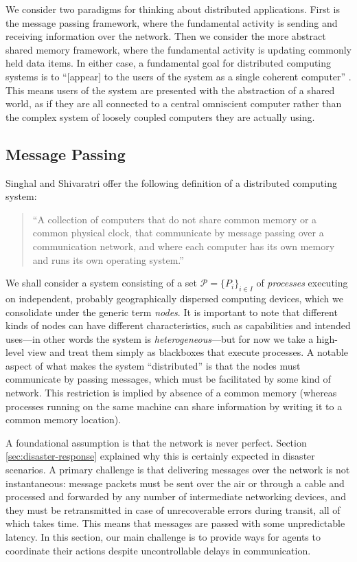 \documentclass[]             %
{NASA}                       %
\theoremstyle{definition}
\begin{document}
We consider two paradigms for thinking about distributed
applications. First is the message passing framework, where the
fundamental activity is sending and receiving information over the
network. Then we consider the more abstract shared memory framework,
where the fundamental activity is updating commonly held data
items. In either case, a fundamental goal for distributed computing
systems is to ``{[}appear{]} to the users of the system as a single
coherent computer'' \cite{TanenbaumSteen07}. This means users of the
system are presented with the abstraction of a shared world, as if
they are all connected to a central omniscient computer rather than
the complex system of loosely coupled computers they are actually
using.

\subsection{Message Passing}
\label{ssec:message-passing}

Singhal and Shivaratri \cite{10.5555/562065} offer the following
definition of a distributed computing system:

\begin{quote}
  ``A collection of computers that do not share common memory or a common
  physical clock, that communicate by message passing over a communication
  network, and where each computer has its own memory and runs its own
  operating system.''
\end{quote}
We shall consider a system consisting of a set \(\mathcal{P} =
\{P_i\}_{i\in I}\) of \emph{processes} executing on independent,
probably geographically dispersed computing devices, which we
consolidate under the generic term \emph{nodes}. It is important to
note that different kinds of nodes can have different characteristics,
such as capabilities and intended uses---in other words the system is
\emph{heterogeneous}---but for now we take a high-level view and treat
them simply as blackboxes that execute processes. A notable aspect of
what makes the system ``distributed'' is that the nodes must
communicate by passing messages, which must be facilitated by some
kind of network. This restriction is implied by absence of a common
memory (whereas processes running on the same machine can share
information by writing it to a common memory location).

A foundational assumption is that the network is never
perfect. Section \ref{sec:disaster-response} explained why this is
certainly expected in disaster scenarios. A primary challenge is that
delivering messages over the network is not instantaneous: message
packets must be sent over the air or through a cable and processed and
forwarded by any number of intermediate networking devices, and they
must be retransmitted in case of unrecoverable errors during transit,
all of which takes time. This means that messages are passed with some
unpredictable latency. In this section, our main challenge is to
provide ways for agents to coordinate their actions despite
uncontrollable delays in communication.
\end{document}
